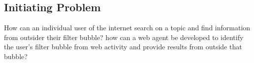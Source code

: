 \subsection*{Initiating Problem}
How can an individual user of the internet search on a topic and find information from outsider their filter bubble?
how can a web agent be developed to identify the user's filter bubble from web activity and provide results from outside that bubble?